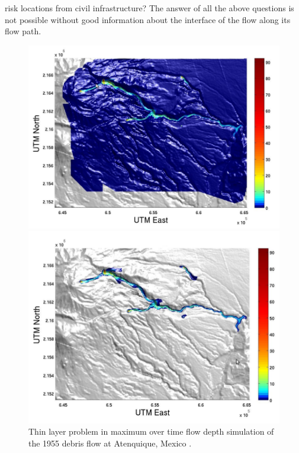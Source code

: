 \documentclass[review]{elsarticle}
\begin{document}
risk locations from civil infrastructure? 
The answer of all the above questions is not possible without good information about the interface of the flow along its flow path.
\begin{figure}[t]
  \begin{minipage}[b]{.45\textwidth}
    \centering
    \includegraphics[width=1\textwidth]{IMAGES/rupps1.png}
  \end{minipage}
\hspace{0.5cm}
  \begin{minipage}[b]{.45\textwidth}
    \centering
    \includegraphics[width=1\textwidth]{IMAGES/rupps2.png}
   \end{minipage}
  \caption{Thin layer problem in maximum over time flow depth simulation of the 1955 debris flow at Atenquique, Mexico \cite{Dalbey2009}.}
  \label{thinlayerproblem}
\end{figure}
\end{document}
